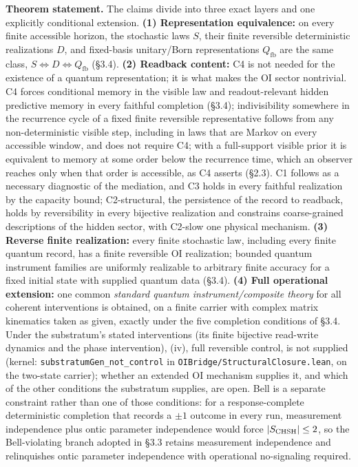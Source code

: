 \documentclass[
]{article}
\begin{document}
\textbf{Theorem statement.} The claims divide into three exact layers
and one explicitly conditional extension. \textbf{(1) Representation
equivalence:} on every finite accessible horizon, the stochastic laws
\(S\), their finite reversible deterministic realizations \(D\), and
fixed-basis unitary/Born representations \(Q_{\mathrm{fb}}\) are the
same class, \(S\iff D\iff Q_{\mathrm{fb}}\) (§3.4). \textbf{(2) Readback
content:} C4 is not needed for the existence of a quantum
representation; it is what makes the OI sector nontrivial. C4 forces
conditional memory in the visible law and readout-relevant hidden
predictive memory in every faithful completion (§3.4); indivisibility
somewhere in the recurrence cycle of a fixed finite reversible
representative follows from any non-deterministic visible step,
including in laws that are Markov on every accessible window, and does
not require C4; with a full-support visible prior it is equivalent to
memory at some order below the recurrence time, which an observer
reaches only when that order is accessible, as C4 asserts (§2.3). C1
follows as a necessary diagnostic of the mediation, and C3 holds in
every faithful realization by the capacity bound; C2-structural, the
persistence of the record to readback, holds by reversibility in every
bijective realization and constrains coarse-grained descriptions of the
hidden sector, with C2-slow one physical mechanism. \textbf{(3) Reverse
finite realization:} every finite stochastic law, including every finite
quantum record, has a finite reversible OI realization; bounded quantum
instrument families are uniformly realizable to arbitrary finite
accuracy for a fixed initial state with supplied quantum data (§3.4).
\textbf{(4) Full operational extension:} one common \emph{standard
quantum instrument/composite theory} for all coherent interventions is
obtained, on a finite carrier with complex matrix kinematics taken as
given, exactly under the five completion conditions of §3.4. Under the
substratum's stated interventions (its finite bijective read-write
dynamics and the phase intervention), (iv), full reversible control, is
not supplied (kernel: \texttt{substratumGen\_not\_control} in
\texttt{OIBridge/StructuralClosure.lean}, on the two-state carrier);
whether an extended OI mechanism supplies it, and which of the other
conditions the substratum supplies, are open. Bell is a separate
constraint rather than one of those conditions: for a response-complete
deterministic completion that records a \(\pm1\) outcome in every run,
measurement independence plus ontic parameter independence would force
\(|S_{\rm CHSH}|\le2\), so the Bell-violating branch adopted in §3.3
retains measurement independence and relinquishes ontic parameter
independence with operational no-signaling required.
\end{document}
